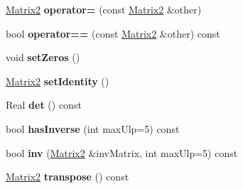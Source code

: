 \begin{DoxyCompactItemize}
\item 
\hypertarget{class_rigid2_d_1_1_matrix2_af726a45c5868c46f7075d3eb711c81c3}{
\hyperlink{class_rigid2_d_1_1_matrix2}{Matrix2} {\bfseries operator=} (const \hyperlink{class_rigid2_d_1_1_matrix2}{Matrix2} \&other)}
\label{class_rigid2_d_1_1_matrix2_af726a45c5868c46f7075d3eb711c81c3}

\item 
\hypertarget{class_rigid2_d_1_1_matrix2_a5d647cae3765e837309a1475d802b260}{
bool {\bfseries operator==} (const \hyperlink{class_rigid2_d_1_1_matrix2}{Matrix2} \&other) const }
\label{class_rigid2_d_1_1_matrix2_a5d647cae3765e837309a1475d802b260}

\item 
\hypertarget{class_rigid2_d_1_1_matrix2_ad9d19746d4606298d0ae862222ad7d43}{
void {\bfseries setZeros} ()}
\label{class_rigid2_d_1_1_matrix2_ad9d19746d4606298d0ae862222ad7d43}

\item 
\hypertarget{class_rigid2_d_1_1_matrix2_af806f5cb0e54a124906bd18c0391dd56}{
\hyperlink{class_rigid2_d_1_1_matrix2}{Matrix2} {\bfseries setIdentity} ()}
\label{class_rigid2_d_1_1_matrix2_af806f5cb0e54a124906bd18c0391dd56}

\item 
\hypertarget{class_rigid2_d_1_1_matrix2_a9348664827626412dc2094b0c35cf809}{
Real {\bfseries det} () const }
\label{class_rigid2_d_1_1_matrix2_a9348664827626412dc2094b0c35cf809}

\item 
\hypertarget{class_rigid2_d_1_1_matrix2_a00a9bfac3510ea82a8f70340376e242d}{
bool {\bfseries hasInverse} (int maxUlp=5) const }
\label{class_rigid2_d_1_1_matrix2_a00a9bfac3510ea82a8f70340376e242d}

\item 
\hypertarget{class_rigid2_d_1_1_matrix2_a552fd146c02478b5c705c2562718004c}{
bool {\bfseries inv} (\hyperlink{class_rigid2_d_1_1_matrix2}{Matrix2} \&invMatrix, int maxUlp=5) const }
\label{class_rigid2_d_1_1_matrix2_a552fd146c02478b5c705c2562718004c}

\item 
\hypertarget{class_rigid2_d_1_1_matrix2_a820a78692047b7698822dec55ecc436f}{
\hyperlink{class_rigid2_d_1_1_matrix2}{Matrix2} {\bfseries transpose} () const }
\label{class_rigid2_d_1_1_matrix2_a820a78692047b7698822dec55ecc436f}

\end{DoxyCompactItemize}
